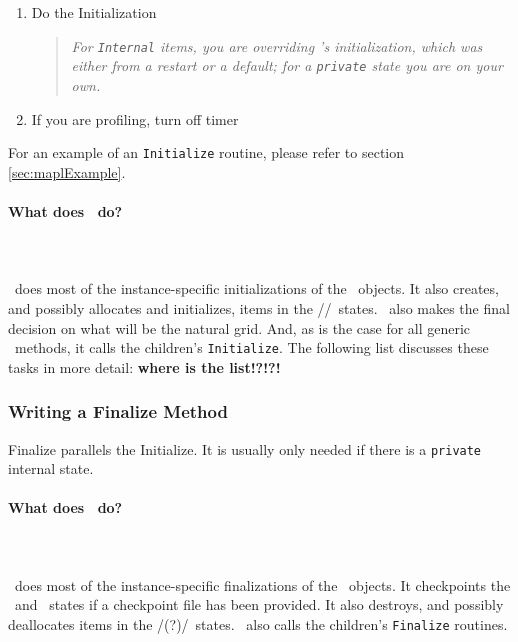 \begin{enumerate}
\item Do the Initialization
  \begin{quote} {\em For {\tt Internal} items, you are overriding 
      \ggn 's initialization, which was either from a restart or a default;
      for a \texttt{private} state you are on your own.} \end{quote}
  
\item If you are profiling, turn off timer
  \begin{quote} {\em } \end{quote}
  
\end{enumerate}

For an example of an \texttt{Initialize} routine, please refer to section
\ref{sec:maplExample}.

\paragraph{What does \gint\ do?}
\label{sec:geninit}
\quad\\\\
\gint\ does most of the instance-specific initializations of
the \ggn\ objects. It also creates, and possibly allocates and
initializes, items in the \IM/\EX/\gIN\ states. \gint\ also makes the
final decision on what will be the natural grid. And, as is the
case for all generic \IRF\ methods, it calls the children's
\texttt{Initialize}. The following list discusses these tasks in more detail:
\textbf{where is the list!?!?!}

\subsubsection{Writing a Finalize Method}

Finalize parallels the Initialize. It is usually only needed if there is a 
\texttt{private} internal state.

\paragraph{What does \gfin\ do?}
\quad\\\\
\gfin\ does most of the instance-specific finalizations of
the \ggn\ objects. It checkpoints the \im\ and \ex\ states if
a checkpoint file has been provided. 
It also destroys, and possibly deallocates items in the \IM/\EX(?)/\gIN\ states.
\gfin\ also calls the children's \texttt{Finalize} routines.

